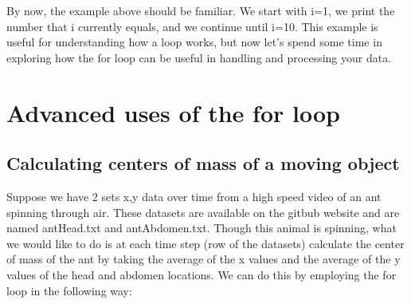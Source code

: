 \documentclass{article}\usepackage{graphicx, color}
\begin{document}
By now, the example above should be familiar. We start with i=1, we print the number that i currently equals, and we continue until i=10. This example is useful for understanding how a loop works, but now let's spend some time in exploring how the for loop can be useful in handling and processing your data.
  
\section{Advanced uses of the for loop}
\subsection{Calculating centers of mass of a moving object}
Suppose we have 2 sets x,y data over time from a high speed video of an ant spinning through air. These datasets are available on the gitbub website and are named antHead.txt and antAbdomen.txt. Though this animal is spinning, what we would like to do is at each time step (row of the datasets) calculate the center of mass of the ant by taking the average of the x values and the average of the y values of the head and abdomen locations. We can do this by employing the for loop in the following way:
\end{document}

